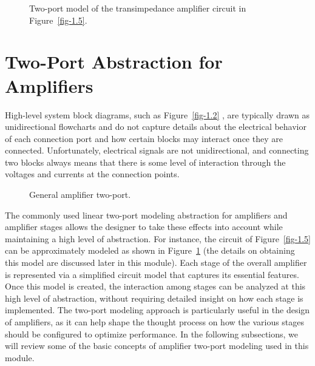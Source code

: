 \documentclass[
  11pt,
  letterpaper,
  abstract]{scrbook}
\begin{document}
\begin{figure}


\caption{\label{fig-1.7}Two-port model of the transimpedance amplifier
circuit in Figure~\ref{fig-1.5}.}

\end{figure}%

\section{Two-Port Abstraction for
Amplifiers}\label{two-port-abstraction-for-amplifiers}

High-level system block diagrams, such as Figure~\ref{fig-1.2} , are
typically drawn as unidirectional flowcharts and do not capture details
about the electrical behavior of each connection port and how certain
blocks may interact once they are connected. Unfortunately, electrical
signals are not unidirectional, and connecting two blocks always means
that there is some level of interaction through the voltages and
currents at the connection points.

\begin{figure}


\caption{\label{fig-1.8}General amplifier two-port.}

\end{figure}%

The commonly used linear two-port modeling abstraction for amplifiers
and amplifier stages allows the designer to take these effects into
account while maintaining a high level of abstraction. For instance, the
circuit of Figure~\ref{fig-1.5} can be approximately modeled as shown in
Figure~\ref{fig-1.7} (the details on obtaining this model are discussed
later in this module). Each stage of the overall amplifier is
represented via a simplified circuit model that captures its essential
features. Once this model is created, the interaction among stages can
be analyzed at this high level of abstraction, without requiring
detailed insight on how each stage is implemented. The two-port modeling
approach is particularly useful in the design of amplifiers, as it can
help shape the thought process on how the various stages should be
configured to optimize performance. In the following subsections, we
will review some of the basic concepts of amplifier two-port modeling
used in this module.
\end{document}
